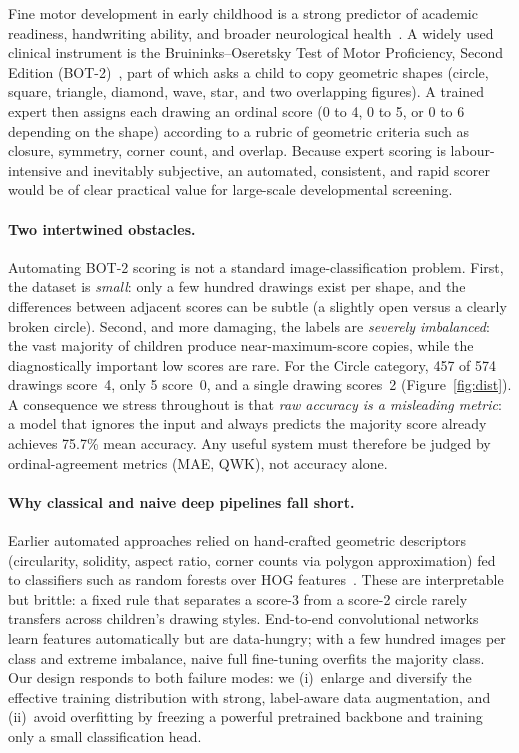 \documentclass[10pt,twocolumn,letterpaper]{article}
\newcommand{\BaselineMeanAcc}{75.7}
\begin{document}
Fine motor development in early childhood is a strong predictor of academic
readiness, handwriting ability, and broader neurological health~\cite{bot2}.
A widely used clinical instrument is the Bruininks--Oseretsky Test of Motor
Proficiency, Second Edition (BOT-2)~\cite{bot2}, part of which asks a child to
copy geometric shapes (circle, square, triangle, diamond, wave, star, and two
overlapping figures). A trained expert then assigns each drawing an ordinal
score (0 to 4, 0 to 5, or 0 to 6 depending on the shape) according to a rubric
of geometric criteria such as closure, symmetry, corner count, and overlap.
Because expert scoring is labour-intensive and inevitably subjective, an
automated, consistent, and rapid scorer would be of clear practical value for
large-scale developmental screening.

\paragraph{Two intertwined obstacles.}
Automating BOT-2 scoring is not a standard image-classification problem.
First, the dataset is \emph{small}: only a few hundred drawings exist per
shape, and the differences between adjacent scores can be subtle (a slightly
open versus a clearly broken circle). Second, and more damaging, the labels
are \emph{severely imbalanced}: the vast majority of children produce
near-maximum-score copies, while the diagnostically important low scores are
rare. For the Circle category, 457 of 574 drawings score~4, only 5 score~0,
and a single drawing scores~2 (Figure~\ref{fig:dist}). A consequence we stress
throughout is that \emph{raw accuracy is a misleading metric}: a model that
ignores the input and always predicts the majority score already achieves
\BaselineMeanAcc\% mean accuracy. Any useful system must therefore be judged
by ordinal-agreement metrics (MAE, QWK), not accuracy alone.

\paragraph{Why classical and naive deep pipelines fall short.}
Earlier automated approaches relied on hand-crafted geometric descriptors
(circularity, solidity, aspect ratio, corner counts via polygon
approximation) fed to classifiers such as random forests over HOG
features~\cite{hog}. These are interpretable but brittle: a fixed rule that
separates a score-3 from a score-2 circle rarely transfers across children's
drawing styles. End-to-end convolutional networks~\cite{mobilenetv2} learn
features automatically but are data-hungry; with a few hundred images per
class and extreme imbalance, naive full fine-tuning overfits the majority
class. Our design responds to both failure modes: we (i)~enlarge and diversify
the effective training distribution with strong, label-aware data
augmentation, and (ii)~avoid overfitting by freezing a powerful pretrained
backbone and training only a small classification head.
\end{document}
